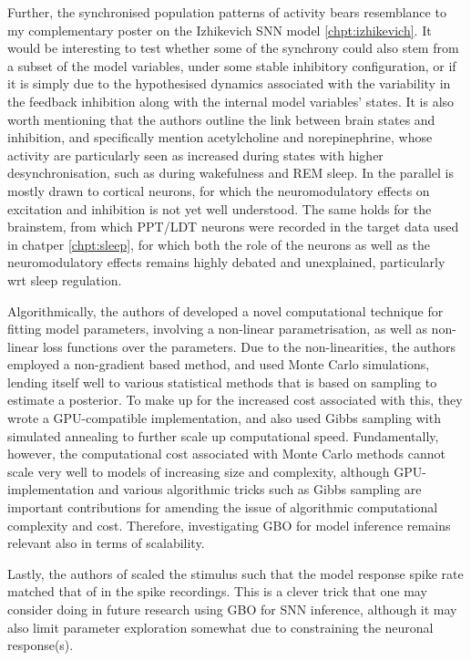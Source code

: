 \documentclass[mphil,deptreport,ianc]{infthesis} %
\begin{document}
Further, the synchronised population patterns of activity bears resemblance to my complementary poster on the Izhikevich SNN model \ref{chpt:izhikevich}. It would be interesting to test whether some of the synchrony could also stem from a subset of the model variables, under some stable inhibitory configuration, or if it is simply due to the hypothesised dynamics associated with the variability in the feedback inhibition along with the internal model variables' states.
It is also worth mentioning that the authors outline the link between brain states and inhibition, and specifically mention acetylcholine and norepinephrine, whose activity are particularly seen as increased during states with higher desynchronisation, such as during wakefulness and REM sleep.
In \cite{Stringer2016InhibitoryNetworks} the parallel is mostly drawn to cortical neurons, for which the neuromodulatory effects on excitation and inhibition is not yet well understood. 
The same holds for the brainstem, from which PPT/LDT neurons were recorded in the target data used in chatper \ref{chpt:sleep}, for which both the role of the neurons as well as the neuromodulatory effects remains highly debated and unexplained, particularly wrt sleep regulation.

Algorithmically, the authors of \cite{Stringer2016InhibitoryNetworks} developed a novel computational technique for fitting model parameters, involving a non-linear parametrisation, as well as non-linear loss functions over the parameters.
Due to the non-linearities, the authors employed a non-gradient based method, and used Monte Carlo simulations, lending itself well to various statistical methods that is based on sampling to estimate a posterior.
To make up for the increased cost associated with this, they wrote a GPU-compatible implementation, and also used Gibbs sampling with simulated annealing to further scale up computational speed.
Fundamentally, however, the computational cost associated with Monte Carlo methods cannot scale very well to models of increasing size and complexity, although GPU-implementation and various algorithmic tricks such as Gibbs sampling are important contributions for amending the issue of algorithmic computational complexity and cost.
Therefore, investigating GBO for model inference remains relevant also in terms of scalability.

Lastly, the authors of \cite{Stringer2016InhibitoryNetworks} scaled the stimulus such that the model response spike rate matched that of in the spike recordings.
This is a clever trick that one may consider doing in future research using GBO for SNN inference, although it may also limit parameter exploration somewhat due to constraining the neuronal response(s).
\end{document}
